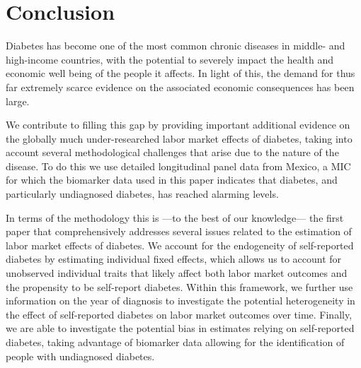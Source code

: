 \documentclass[12pt,english]{article}
\begin{document}
{\section{\label{sec:Conclusion}Conclusion}

Diabetes has become one of the most common chronic diseases in middle- and high-income countries, with the potential to severely impact the health and economic well being of the people it affects.  In light of this, the demand for thus far extremely scarce evidence on the associated economic consequences has been large. 

We contribute to filling this gap by providing important additional evidence on the globally much under-researched labor market effects of diabetes, taking into account several methodological challenges that arise due to the nature of the disease. To do this we use detailed longitudinal panel data from Mexico, a \ac{MIC} for which the biomarker data used in this paper indicates that diabetes, and particularly undiagnosed diabetes, has reached alarming levels.

In terms of the methodology this is ---to the best of our knowledge--- the first paper that comprehensively addresses several issues related to the estimation of labor market effects of diabetes. We account for the endogeneity of self-reported diabetes by estimating individual fixed effects, which allows us to account for unobserved individual traits that likely affect both labor market outcomes and the propensity to be self-report diabetes. Within this framework, we further use information on the year of diagnosis to investigate the potential heterogeneity in the effect of self-reported diabetes on labor market outcomes over time. Finally, we are able to investigate the potential bias in estimates relying on self-reported diabetes, taking advantage of biomarker data allowing for the identification of people with undiagnosed diabetes. 

}
\end{document}
